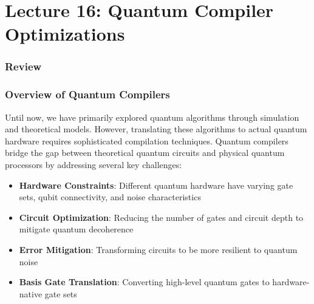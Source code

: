 \section{Lecture 16: Quantum Compiler Optimizations}\label{sec:lecture16}

\subsubsection*{Review}




\subsubsection*{Overview of Quantum Compilers}

Until now, we have primarily explored quantum algorithms through simulation
and theoretical models. However, translating these algorithms to actual
quantum hardware requires sophisticated compilation techniques. Quantum
compilers bridge the gap between theoretical quantum circuits and physical
quantum processors by addressing several key challenges:

\begin{itemize}
  \item \textbf{Hardware Constraints}: Different quantum hardware have
    varying gate sets, qubit connectivity, and noise characteristics

  \item \textbf{Circuit Optimization}: Reducing the number of gates and
    circuit depth to mitigate quantum decoherence

  \item \textbf{Error Mitigation}: Transforming circuits to be more resilient
    to quantum noise

  \item \textbf{Basis Gate Translation}: Converting high-level quantum gates
    to hardware-native gate sets
\end{itemize}

